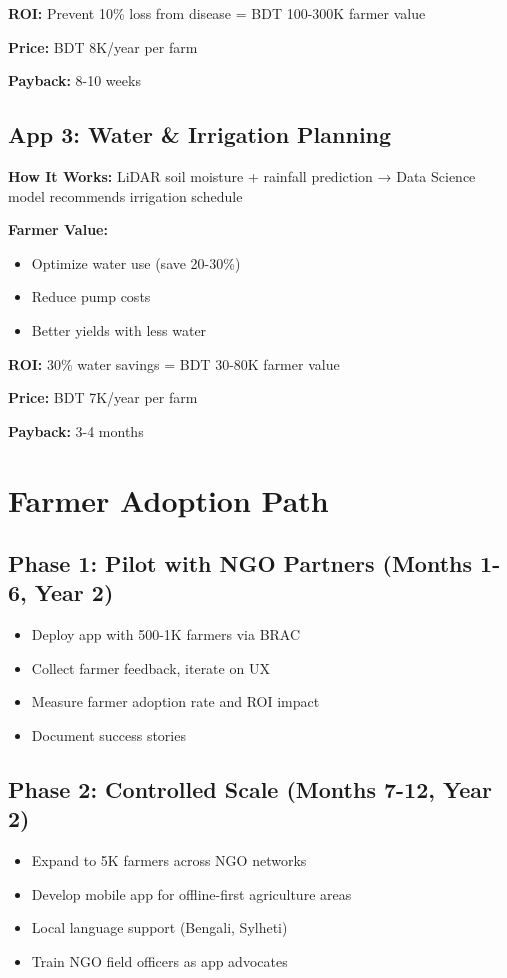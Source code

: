 \textbf{ROI:} Prevent 10\% loss from disease = BDT 100-300K farmer value

\textbf{Price:} BDT 8K/year per farm

\textbf{Payback:} 8-10 weeks

\subsection{App 3: Water \& Irrigation Planning}

\textbf{How It Works:} LiDAR soil moisture + rainfall prediction → Data Science model recommends irrigation schedule

\textbf{Farmer Value:}
\begin{itemize}
    \item Optimize water use (save 20-30\%)
    \item Reduce pump costs
    \item Better yields with less water
\end{itemize}

\textbf{ROI:} 30\% water savings = BDT 30-80K farmer value

\textbf{Price:} BDT 7K/year per farm

\textbf{Payback:} 3-4 months

\section{Farmer Adoption Path}

\subsection{Phase 1: Pilot with NGO Partners (Months 1-6, Year 2)}

\begin{itemize}
    \item Deploy app with 500-1K farmers via BRAC
    \item Collect farmer feedback, iterate on UX
    \item Measure farmer adoption rate and ROI impact
    \item Document success stories
\end{itemize}

\subsection{Phase 2: Controlled Scale (Months 7-12, Year 2)}

\begin{itemize}
    \item Expand to 5K farmers across NGO networks
    \item Develop mobile app for offline-first agriculture areas
    \item Local language support (Bengali, Sylheti)
    \item Train NGO field officers as app advocates
\end{itemize}

